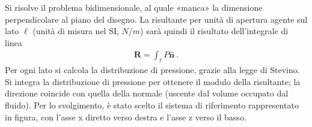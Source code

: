 \documentclass[letterpaper,10pt,italian]{jupyterBook}
\begin{document}
\sphinxAtStartPar
{} Si risolve il problema bidimensionale, al quale «manca» la dimensione
perpendicolare al piano del disegno. La risultante per unità di apertura
agente sul lato \(\ell\) (unità di misura nel SI, \(N/m\)) sarà quindi il
risultato dell’integrale di linea
\begin{equation*}
\begin{split}\mathbf{R} = \int_{\ell} P \mathbf{\hat{n}} \ .\end{split}
\end{equation*}
\sphinxAtStartPar
Per ogni lato si calcola la
distribuzione di pressione, grazie alla legge di Stevino. Si integra la
distribuzione di pressione per ottenere il modulo della risultante; la
direzione coincide con quella della normale (uscente dal volume occupato
dal fluido). Per lo svolgimento, è stato scelto il sistema di
riferimento rappresentato in figura, con l’asse x diretto verso destra e
l’asse z verso il basso.
\end{document}
